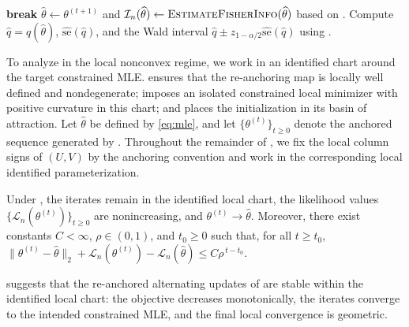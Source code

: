 \documentclass{article}
\begin{document}
\begin{bibunit}[unsrtnat]
\begin{algorithm}[t]
\begin{algorithmic}[1]
            \State \textbf{break}
        \EndIf
    \EndFor
    \State \(\widehat{\theta}\gets \theta^{(t+1)}\) and $\mathcal{I}_n(\widehat\theta) \gets \textsc{EstimateFisherInfo}(\widehat\theta)$ based on .
    \State Compute \(\widehat q=q(\widehat\theta)\), \(\widehat{\mathrm{se}}(\widehat q)\), and the Wald interval \(\widehat q\pm z_{1-\alpha/2}\widehat{\mathrm{se}}(\widehat q)\) using .
    \end{algorithmic}
\end{algorithm}



To analyze  in the local nonconvex regime, we work in an identified chart around the target constrained MLE. 
 ensures that the re-anchoring map is locally well defined and nondegenerate;  imposes an isolated constrained local minimizer with positive curvature in this chart; and  places the initialization in its basin of attraction.
Let \(\widehat{\theta}\) be defined by \eqref{eq:mle}, and let \(\{\theta^{(t)}\}_{t\geq 0}\) denote the anchored sequence generated by . 
Throughout the remainder of , we fix the local column signs of \((U,V)\) by the anchoring convention and work in the corresponding local identified parameterization.

\begin{theorem}
\label{thm:main_convergence}    
    Under , the iterates remain in the identified local chart, the likelihood values
    \(\{\mathcal{L}_n(\theta^{(t)})\}_{t\geq 0}\) are nonincreasing, and
    \(
        \theta^{(t)} \to \widehat{\theta} .
    \) 
    Moreover, there exist constants \(C<\infty\), \(\rho\in(0,1)\), and \(t_0\geq 0\) such that, for all \(t\geq t_0\),
    \(
        \|\theta^{(t)}-\widehat{\theta}\|_2
        +
        \mathcal{L}_n(\theta^{(t)})-\mathcal{L}_n(\widehat{\theta})
        \leq
        C\rho^{\,t-t_0}.
    \)
\end{theorem}

 suggests that the re-anchored alternating updates of  are stable within the identified local chart: the objective decreases monotonically, the iterates converge to the intended constrained MLE, and the final local convergence is geometric. 






\end{bibunit}
\end{document}
